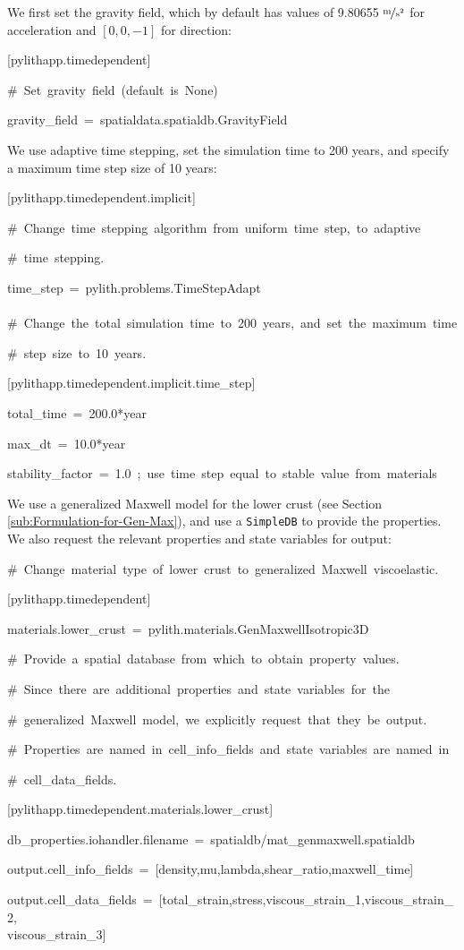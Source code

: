 We first set the gravity field, which by default has values of 9.80655
$\unitfrac{m}{s^{2}}$ for acceleration and $\left[0,0,-1\right]$
for direction:
\begin{lyxcode}
{[}pylithapp.timedependent{]}

\#~Set~gravity~field~(default~is~None)

gravity\_field~=~spatialdata.spatialdb.GravityField
\end{lyxcode}
We use adaptive time stepping, set the simulation time to 200 years,
and specify a maximum time step size of 10 years:
\begin{lyxcode}
{[}pylithapp.timedependent.implicit{]}

\#~Change~time~stepping~algorithm~from~uniform~time~step,~to~adaptive

\#~time~stepping.

time\_step~=~pylith.problems.TimeStepAdapt~\\
~\\


\#~Change~the~total~simulation~time~to~200~years,~and~set~the~maximum~time

\#~step~size~to~10~years.

{[}pylithapp.timedependent.implicit.time\_step{]}

total\_time~=~200.0{*}year

max\_dt~=~10.0{*}year

stability\_factor~=~1.0~;~use~time~step~equal~to~stable~value~from~materials
\end{lyxcode}
We use a generalized Maxwell model for the lower crust (see Section
\vref{sub:Formulation-for-Gen-Max}), and use a \texttt{SimpleDB} to
provide the properties. We also request the relevant properties and
state variables for output:
\begin{lyxcode}
\#~Change~material~type~of~lower~crust~to~generalized~Maxwell~viscoelastic.

{[}pylithapp.timedependent{]}

materials.lower\_crust~=~pylith.materials.GenMaxwellIsotropic3D

\#~Provide~a~spatial~database~from~which~to~obtain~property~values.

\#~Since~there~are~additional~properties~and~state~variables~for~the

\#~generalized~Maxwell~model,~we~explicitly~request~that~they~be~output.

\#~Properties~are~named~in~cell\_info\_fields~and~state~variables~are~named~in

\#~cell\_data\_fields.

{[}pylithapp.timedependent.materials.lower\_crust{]}

db\_properties.iohandler.filename~=~spatialdb/mat\_genmaxwell.spatialdb

output.cell\_info\_fields~=~{[}density,mu,lambda,shear\_ratio,maxwell\_time{]}

output.cell\_data\_fields~=~{[}total\_strain,stress,viscous\_strain\_1,viscous\_strain\_2,~\\
viscous\_strain\_3{]}
\end{lyxcode}
